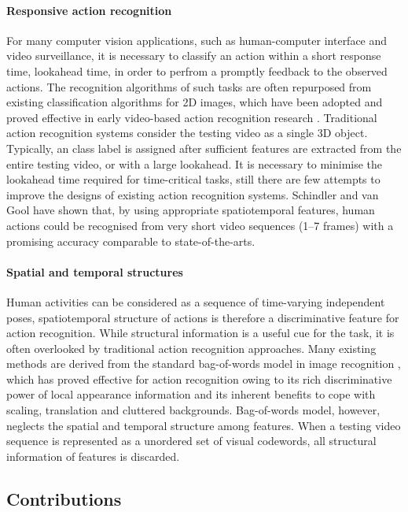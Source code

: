 \paragraph{Responsive action recognition}  For many computer vision applications, such as human-computer interface and video surveillance, it is necessary to classify an action within a short response time, \ie lookahead time, in order to perfrom a promptly feedback to the observed actions.  The recognition algorithms of such tasks are often repurposed from existing classification algorithms for 2D images, which have been adopted and proved effective in early video-based action recognition research \cite{Schuldt2004, Dollar2005}.  Traditional action recognition systems consider the testing video as a single 3D object. Typically, an class label is assigned after sufficient features are extracted from the entire testing video, or with a large lookahead. It is necessary to minimise the lookahead time required for time-critical tasks, still there are few attempts to improve the designs of existing action recognition systems. Schindler and van Gool \cite{Schindler2008} have shown that, by using appropriate spatiotemporal features, human actions could be recognised from very short video sequences (1--7 frames) with a promising accuracy comparable to state-of-the-arts.

\paragraph{Spatial and temporal structures}
Human activities can be considered as a sequence of time-varying independent poses, spatiotemporal structure of actions is therefore a discriminative feature for action recognition.  
While structural information is a useful cue for the task, it is often overlooked by traditional action recognition approaches.  
Many existing methods are derived from the standard bag-of-words model in image recognition \cite{Sivic2005, Fei-Fei2005}, which has proved effective for action recognition owing to its rich discriminative power of local appearance information and its inherent benefits to cope with scaling, translation and cluttered backgrounds. 
Bag-of-words model, however, neglects the spatial and temporal structure among features. 
When a testing video sequence is represented as a unordered set of visual codewords, all structural information of features is discarded. 

\subsection{Contributions}

